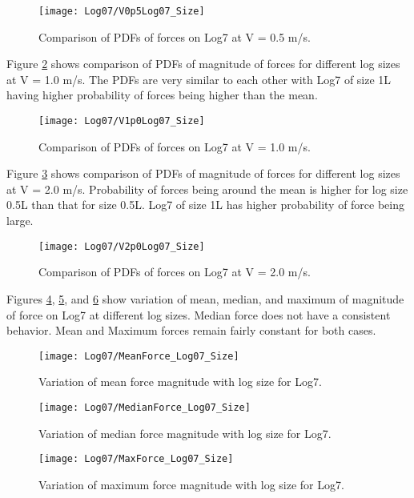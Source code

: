 \begin{figure}
\centering
\texttt{[image: Log07/V0p5Log07\_Size]}
\caption{\label{fig:V0p5Log07_Size}Comparison of PDFs of forces on Log7 at V = 0.5 m/s.}
\end{figure}

\noindent Figure \ref{fig:V1p0Log07_Size} shows comparison of PDFs of magnitude of forces for different log sizes at V = 1.0 m/s. The PDFs are very similar to each other with Log7 of size 1L having higher probability of forces being higher than the mean.  

\begin{figure}
\centering
\texttt{[image: Log07/V1p0Log07\_Size]}
\caption{\label{fig:V1p0Log07_Size}Comparison of PDFs of forces on Log7 at V = 1.0 m/s.}
\end{figure}

\noindent Figure \ref{fig:V2p0Log07_Size} shows comparison of PDFs of magnitude of forces for different log sizes at V = 2.0 m/s. Probability of forces being around the mean is higher for log size 0.5L than that for size 0.5L. Log7 of size 1L has higher probability of force being large.  

\begin{figure}
\centering
\texttt{[image: Log07/V2p0Log07\_Size]}
\caption{\label{fig:V2p0Log07_Size}Comparison of PDFs of forces on Log7 at V = 2.0 m/s.}
\end{figure}

\noindent Figures \ref{fig:MeanForce_Log07_Size}, \ref{fig:MedianForce_Log07_Size}, and \ref{fig:MaxForce_Log07_Size} show variation of mean, median, and maximum of magnitude of force on Log7 at different log sizes. Median force does not have a consistent behavior. Mean and Maximum forces remain fairly constant for both cases.

\begin{figure}
\centering
\texttt{[image: Log07/MeanForce\_Log07\_Size]}
\caption{\label{fig:MeanForce_Log07_Size}Variation of mean force magnitude with log size for Log7.}
\end{figure}
\begin{figure}
\centering
\texttt{[image: Log07/MedianForce\_Log07\_Size]}
\caption{\label{fig:MedianForce_Log07_Size}Variation of median force magnitude with log size for Log7.}
\end{figure}
\begin{figure}
\centering
\texttt{[image: Log07/MaxForce\_Log07\_Size]}
\caption{\label{fig:MaxForce_Log07_Size}Variation of maximum force magnitude with log size for Log7.}
\end{figure}

